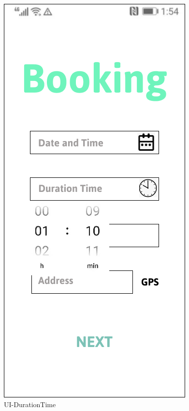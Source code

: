 \documentclass[a4paper,12pt]{report}
\begin{document}
\begin{figure}[H]
	\begin{minipage}[t]{0.56\linewidth}
		\centering
		\includegraphics[scale=0.5]{UI-DurationTime.png}
		\caption{UI-DurationTime}
		\label{fig:UI-DurationTime}
	\end{minipage}%
	\begin{minipage}[t]{0.56\linewidth}
		\centering

\end{minipage}
\end{figure}
\end{document}
